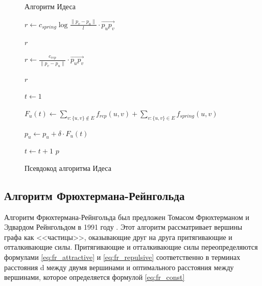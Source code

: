 \documentclass[14pt, russian]{scrartcl}
\begin{document}
\begin{figure}[H]
	\centering
	\begin{minipage}[t]{.9\textwidth}
		\centering

		\begin{algorithm}[H]
			\caption{Алгоритм Идеса}
			\begin{algorithmic}

				\State $r \gets c_{spring}\log{\frac{\|p_v - p_u \|}{l}}  \cdot \overrightarrow{p_u p_v}  $

				\Return $r$
				\EndFunction


				\State $r \gets \frac{c_{rep}}{\|p_v - p_u \|} \cdot \overrightarrow{p_u p_v}  $

				\Return $r$
				\EndFunction


				\State $t \gets 1$

				\State $F_{u}(t) \gets \sum_{v:\{u,v\} \notin E}{f_{rep}(u, v)} + \sum_{v:\{u,v\} \in E}{f_{spring}(u, v)}$


				\EndFor
				\State $p_u \gets p_u + \delta \cdot F_u(t)$
				\EndFor

				\State $t \gets t + 1$
				\EndWhile
				\Return $p$
				\EndFunction


			\end{algorithmic}
		\end{algorithm}
	\end{minipage}
	\caption{Псевдокод алгоритма Идеса}
	\label{fig:eades_alg}
\end{figure}


\newpage

\subsection{Алгоритм Фрюхтермана-Рейнгольда }

Алгоритм Фрюхтермана-Рейнгольда был предложен Томасом Фрюхтерманом и Эдвардом Рейнгольдом в 1991 году \cite{FR}. Этот алгоритм рассматривает вершины графа как <<частицы>>, оказывающие друг на друга притягивающие и  отталкивающие силы. Притягивающие и отталкивающие
силы переопределяются формулами \ref{eq:fr_attractive} и \ref{eq:fr_repulsive} соответственно в терминах расстояния d между двумя вершинами и оптимального расстояния между вершинами, которое определяется формулой \ref{eq:fr_const}
\end{document}
